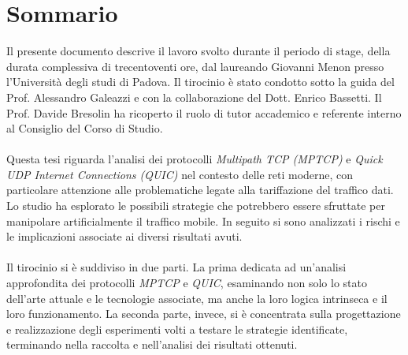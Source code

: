 \cleardoublepage
{}
{}
\begingroup
\let\clearpage\relax
\let\cleardoublepage\relax
\let\cleardoublepage\relax

\chapter*{Sommario}

Il presente documento descrive il lavoro svolto durante il periodo di stage, della durata complessiva di trecentoventi ore, dal laureando Giovanni Menon presso l'Università degli studi di Padova.
Il tirocinio è stato condotto sotto la guida del Prof. Alessandro Galeazzi e con la collaborazione del Dott. Enrico Bassetti.
Il Prof. Davide Bresolin ha ricoperto il ruolo di tutor accademico e referente interno al Consiglio del Corso di Studio.
\\\\
Questa tesi riguarda l'analisi dei protocolli \emph{Multipath TCP (MPTCP)} e \emph{Quick UDP Internet Connections (QUIC)} nel contesto delle reti moderne, 
con particolare attenzione alle problematiche legate alla tariffazione del traffico dati. Lo studio ha esplorato le possibili strategie che potrebbero
essere sfruttate per manipolare artificialmente il traffico mobile. 
In seguito si sono analizzati i rischi e le implicazioni associate ai diversi risultati avuti.
\\\\
Il tirocinio si è suddiviso in due parti.
La prima dedicata ad un'analisi approfondita dei protocolli \emph{MPTCP} e \emph{QUIC}, esaminando non solo lo stato dell'arte attuale e le tecnologie associate, ma anche la loro logica intrinseca e il loro funzionamento.
La seconda parte, invece, si è concentrata sulla progettazione e realizzazione degli esperimenti volti a testare le strategie identificate, terminando nella raccolta e nell'analisi dei risultati ottenuti.



\endgroup

\vfill
